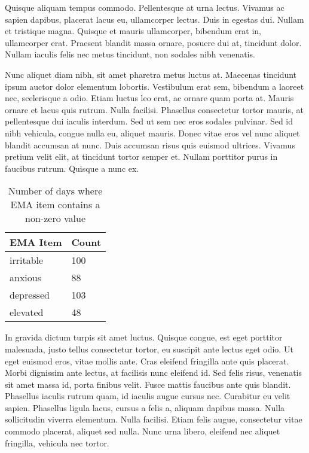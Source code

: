 \documentclass{article}
\begin{document}
Quisque aliquam tempus commodo. Pellentesque at urna lectus. Vivamus ac
sapien dapibus, placerat lacus eu, ullamcorper lectus. Duis in egestas
dui. Nullam et tristique magna. Quisque et mauris ullamcorper, bibendum
erat in, ullamcorper erat. Praesent blandit massa ornare, posuere dui
at, tincidunt dolor. Nullam iaculis felis nec metus tincidunt, non
sodales nibh venenatis.

Nunc aliquet diam nibh, sit amet pharetra metus luctus at. Maecenas
tincidunt ipsum auctor dolor elementum lobortis. Vestibulum erat sem,
bibendum a laoreet nec, scelerisque a odio. Etiam luctus leo erat, ac
ornare quam porta at. Mauris ornare et lacus quis rutrum. Nulla
facilisi. Phasellus consectetur tortor mauris, at pellentesque dui
iaculis interdum. Sed ut sem nec eros sodales pulvinar. Sed id nibh
vehicula, congue nulla eu, aliquet mauris. Donec vitae eros vel nunc
aliquet blandit accumsan at nunc. Duis accumsan risus quis euismod
ultrices. Vivamus pretium velit elit, at tincidunt tortor semper et.
Nullam porttitor purus in faucibus rutrum. Quisque a nunc ex.

\begin{table}[!hp]
    \centering
    \begin{tabular}{ll}
    \toprule
        \textbf{EMA Item} & \textbf{Count} \\ \midrule
        irritable & 100 \\
        anxious & 88  \\
        depressed & 103  \\
        elevated & 48  \\
        \bottomrule
    \end{tabular}
\caption{Number of days where EMA item contains a non-zero value}
\label{EMA}
\end{table}

In gravida dictum turpis sit amet luctus. Quisque congue, est eget
porttitor malesuada, justo tellus consectetur tortor, eu suscipit ante
lectus eget odio. Ut eget euismod eros, vitae mollis ante. Cras eleifend
fringilla ante quis placerat. Morbi dignissim ante lectus, at facilisis
nunc eleifend id. Sed felis risus, venenatis sit amet massa id, porta
finibus velit. Fusce mattis faucibus ante quis blandit. Phasellus
iaculis rutrum quam, id iaculis augue cursus nec. Curabitur eu velit
sapien. Phasellus ligula lacus, cursus a felis a, aliquam dapibus massa.
Nulla sollicitudin viverra elementum. Nulla facilisi. Etiam felis augue,
consectetur vitae commodo placerat, aliquet sed nulla. Nunc urna libero,
eleifend nec aliquet fringilla, vehicula nec tortor.
\end{document}
